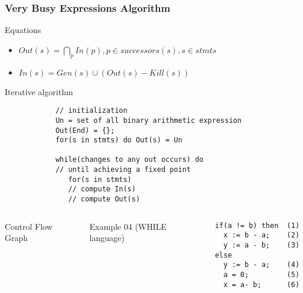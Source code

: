 \begin{frame}[fragile]
	\frametitle{Very Busy Expressions Algorithm}
	
	\begin{block}{Equations}
		\begin{itemize}
			\item $Out(s) = \bigcap_p In(p), p \in successors(s), s \in stmts$
			\item $In(s) = Gen(s) \cup (Out(s) - Kill(s))$  
		\end{itemize}
	\end{block}
	
	\pause
	
	\begin{block}{Iterative algorithm}
		\begin{small}
			\begin{verbatim}
			// initialization
			Un = set of all binary arithmetic expression
			Out(End) = {};
			for(s in stmts) do Out(s) = Un
			
			while(changes to any out occurs) do  
			// until achieving a fixed point
			   for(s in stmts)
			   // compute In(s) 
			   // compute Out(s)   
			\end{verbatim}
		\end{small}
	\end{block}
\end{frame}



\begin{frame}[fragile]
    \begin{columns}
    Control Flow Graph
    
    
    
Example 04 (WHILE language)
    
\begin{verbatim}
if(a != b) then  (1)
  x := b - a;    (2)
  y := a - b;    (3)
else    
  y := b - a;    (4) 
  a = 0;         (5) 
  x = a- b;      (6) 
\end{verbatim}


\end{columns}
  
\end{frame}



